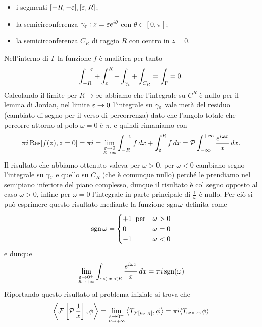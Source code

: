 \begin{itemize}
  \item i segmenti $ [-R, -\eps], [\eps, R] $;
  \item la semicirconferenza $ \gamma_\eps: z = \eps e^{i\theta} $ con $ \theta \in [0, \pi] $;
  \item la semicirconferenza $ C_R $ di raggio $ R $ con centro in $ z = 0 $.
\end{itemize}
Nell'interno di $ \Gamma $ la funzione $ f $ è analitica per tanto
\begin{align}
  \int_{-R}^{-\eps} + \int_{\eps}^{R} + \int_{\gamma_\eps} + \int_{C_R} = \int_{\Gamma} = 0.
\end{align}
Calcolando il limite per $ R \to \infty $ abbiamo che l'integrale su $ C^R $ è nullo per il lemma di Jordan, nel limite $ \eps \to 0 $ 
l'integrale su $ \gamma_\eps $ vale metà del residuo (cambiato di segno per il verso di percorrenza) 
dato che l'angolo totale che percorre attorno al polo $ \omega = 0 $ è $ \pi $, e quindi rimaniamo con
\begin{align}
  \pi i \Res[ f(z), z = 0 ] = \pi i 
  = \lim_{\un{\eps \to 0}{ R \to \infty}} \int_{-R}^{-\eps} f\,dx + \int_{\eps}^{R}f\,dx 
  = \P\int_{-\infty}^{+\infty} \frac{e^{i\omega x}}{x}\,dx.
\end{align}
Il risultato che abbiamo ottenuto valeva per $ \omega > 0 $, per $ \omega < 0 $ cambiano segno l'integrale su $ \gamma_\eps $ e quello su $ C_R $ 
(che è comunque nullo) perché le prendiamo nel semipiano inferiore del piano complesso, dunque il risultato è col segno opposto al caso $ \omega > 0 $, 
infine per $ \omega = 0 $ l'integrale in parte principale di $ \frac1\omega $ è nullo. Per ciò si può esprimere questo risultato mediante la funzione 
$ \sgn \omega $ definita come 
\begin{align}
  \sgn \omega = 
  \begin{cases}
    +1 \;\;\textnormal{per} &\omega > 0
    \\
    0  \;\;\phantom{per} &\omega = 0
    \\
    -1 \;\;\phantom{per} &\omega < 0
  \end{cases}
\end{align}
e dunque 
\begin{align}
  \lim_{\un{\eps\to0^+}{R\to+\infty}} \int_{\eps < \abs{x} < R} \frac{e^{i\omega x}}x \,dx = \pi i \sgn(\omega)
\end{align}
Riportando questo risultato al problema iniziale si trova che 
\begin{align}
  \sca{\F\left[ \P\frac1x \right], \phi} 
  = \lim_{\un{\eps\to0^+}{R\to+\infty}} \sca{T_{\F\left[ u_{\eps,R} \right]}, \phi} 
  = \pi i\sc{T_{\sgn x}, \phi}
\end{align}
